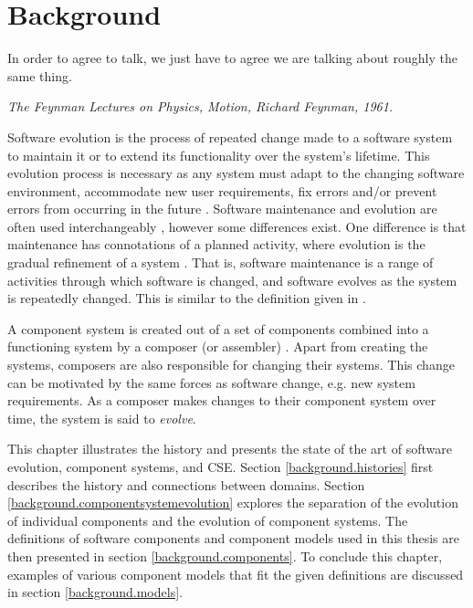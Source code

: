 \chapter{Background}
\label{background}
\epigraph{
In order to agree to talk, we just have to agree we are talking about roughly the same thing.
}
{\textit{The Feynman Lectures on Physics, Motion, Richard Feynman, 1961.}}

Software evolution \citep{lehman1980} is the process of repeated change made to a software system to maintain it or to extend its functionality over the system's lifetime.
This evolution process is necessary as any system must adapt to the changing software environment, accommodate new user requirements, 
fix errors and/or prevent errors from occurring in the future \citep{IsoIec2006}.
Software maintenance and evolution are often used interchangeably \citep{Godfrey2008}, however some differences exist.
One difference is that maintenance has connotations of a planned activity, where evolution is the gradual refinement of a system \citep{lehman1980}.
That is, software maintenance is a range of activities through which software is changed, and software evolves as the system is repeatedly changed.
This is similar to the definition given in \citep{lehman1980}.

A component system is created out of a set of components combined into a functioning system by a composer (or assembler) \citep{Szyperski2002}.
Apart from creating the systems, composers are also responsible for changing their systems.
This change can be motivated by the same forces as software change, e.g. new system requirements.   
As a composer makes changes to their component system over time, the system is said to \textit{evolve}.

This chapter illustrates the history and presents the state of the art of software evolution, component systems, and CSE.
Section \ref{background.histories} first describes the history and connections between domains. 
Section \ref{background.componentsystemevolution} explores the separation of the evolution of individual components and the evolution of component systems.
The definitions of software components and component models used in this thesis are then presented in section \ref{background.components}.
To conclude this chapter, examples of various component models that fit the given definitions are discussed in section \ref{background.models}.

